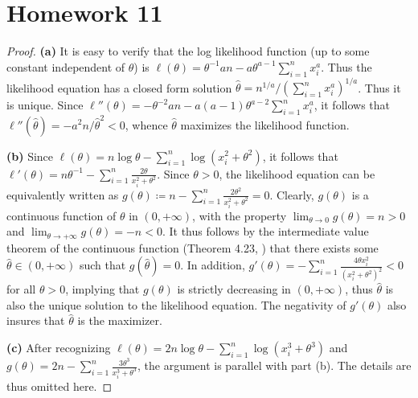 \documentclass{article}
\theoremstyle{definition}
\theoremstyle{plain}
\theoremstyle{remark}
\begin{document}
\section*{Homework 11}
\begin{description}
\begin{comment}
\item[7.2]
The proof can be found in pages 116-117 of \cite{ferguson1996}, with necessary 
(obvious) adaptation. 
\end{comment}

\item[7.3]
\begin{proof}
\textbf{(a)}
It is easy to verify that the log likelihood function (up to some constant 
independent of $\theta$) is $\ell(\theta) = \theta^{-1}an - a\theta^{a - 1}
\sum_{i = 1}^n x_i^a$. Thus the likelihood equation has a closed form solution
$\hat{\theta} = n^{1/a}/(\sum_{i = 1}^n x_i^a)^{1/a}$. Thus it is unique. Since
$\ell''(\theta) = -\theta^{-2}an - a(a - 1)\theta^{a - 2}\sum_{i = 1}^n x_i^a$,
it follows that $\ell''(\hat{\theta}) = -a^2n/\hat{\theta}^2 < 0$, whence 
$\hat{\theta}$ maximizes the likelihood function. 

\textbf{(b)} Since $\ell(\theta) = n\log\theta - \sum_{i = 1}^n\log(x_i^2 + 
\theta^2)$, it follows that $\ell'(\theta) = n\theta^{-1} - \sum_{i = 1}^n
\frac{2\theta}{x_i^2 + \theta^2}$. Since $\theta > 0$, the likelihood equation
can be equivalently written as $g(\theta) \coloneqq n - \sum_{i = 1}^n
\frac{2\theta^2}{x_i^2 + \theta^2} = 0$. Clearly, $g(\theta)$ is a continuous
function of $\theta$ in $(0, +\infty)$, with the property $\lim_{\theta \to 0}
g(\theta) = n > 0$ and $\lim_{\theta \to +\infty}g(\theta) = -n < 0$. It thus
follows by the intermediate value theorem of the continuous function 
(Theorem 4.23, \cite{rudin1964}) that there exists some $\hat{\theta} \in (0, 
+\infty)$ such that $g(\hat{\theta}) = 0$. In addition, $g'(\theta) = 
-\sum_{i = 1}^n \frac{4\theta x_i^2}{(x_i^2 + \theta^2)^2} < 0$ for all $\theta 
> 0$, implying that $g(\theta)$ is strictly decreasing in $(0, +\infty)$, thus
$\hat{\theta}$ is also the unique solution to the likelihood equation. The 
negativity of $g'(\theta)$ also insures that $\hat{\theta}$ is the maximizer. 

\textbf{(c)} After recognizing $\ell(\theta) = 2n\log\theta - \sum_{i = 1}^n
\log(x_i^3 + \theta^3)$ and $g(\theta) = 2n - \sum_{i = 1}^n \frac{3\theta^3}
{x_i^3 + \theta^3}$, the argument is parallel with part (b). The details are thus
omitted here. 
\end{proof}


\end{description}
\end{document}
